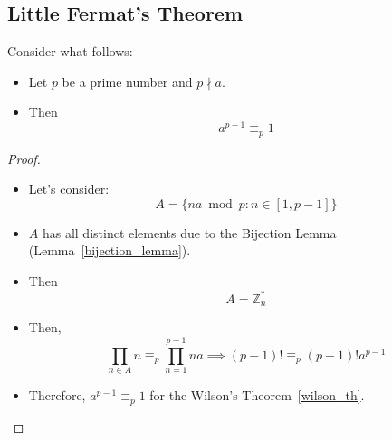 \subsection{Little Fermat's Theorem}\label{little_fermat_th}
\begin{theorem}
    Consider what follows:
    \begin{itemize}
        \item Let $p$ be a prime number and $p \nmid a$.
        \item Then \[a^{p-1} \equiv_{p} 1\]
    \end{itemize}
\end{theorem}
\begin{proof}
    \begin{itemize}
        \item Let's consider: \[A = \{na \bmod p: n \in [1, p-1]\}\]
        \item $A$ has all distinct elements due to the Bijection Lemma (Lemma~\ref{bijection_lemma}).
        \item Then \[A = \mathbb{Z}_{n}^{*}\]
        \item Then, \[\prod\limits_{n \in A} n \equiv_{p} \prod\limits_{n=1}^{p-1} na \implies (p-1)! \equiv_{p} (p-1)!a^{p-1}\]
        \item Therefore, $a^{p-1} \equiv_{p} 1$ for the Wilson's Theorem~\ref{wilson_th}.
    \end{itemize}
\end{proof}

